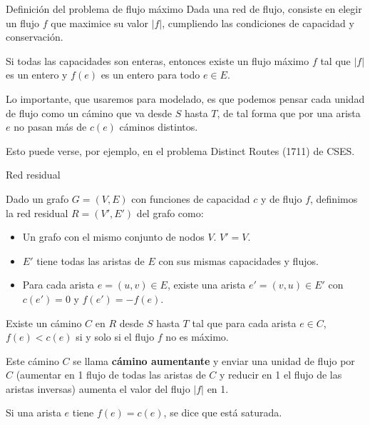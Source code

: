 \documentclass{beamer}
\begin{document}
\begin{frame}{Definición del problema de flujo máximo}
    Dada una red de flujo, consiste en elegir un flujo $f$ que maximice su valor $|f|$, cumpliendo las condiciones de capacidad y conservación.
    
    \begin{Theorem}
        Si todas las capacidades son enteras, entonces existe un flujo máximo $f$ tal que $|f|$ es un entero y $f(e)$ es un entero para todo $e \in E$.
    \end{Theorem}

    \pause

    Lo importante, que usaremos para modelado, es que podemos pensar cada unidad de flujo como un cámino que va desde $S$ hasta $T$, de tal forma que por una arista $e$ no pasan más de $c(e)$ cáminos distintos.

    Esto puede verse, por ejemplo, en el problema Distinct Routes (1711) de CSES.
\end{frame}

\begin{frame}{Red residual}
    \begin{definition}
        Dado un grafo $G = (V,E)$ con funciones de capacidad $c$ y de flujo $f$, definimos la red residual $R = (V',E')$ del grafo como:
        \begin{itemize}
            \item Un grafo con el mismo conjunto de nodos $V$. $V' = V$.
            \item $E'$ tiene todas las aristas de $E$ con sus mismas capacidades y flujos.
            \item Para cada arista $e = (u,v) \in E$, existe una arista $e' = (v,u) \in E'$ con $c(e') = 0$ y $f(e') = -f(e)$.
        \end{itemize}
    \end{definition}

    \pause 

    \begin{Theorem}
        Existe un cámino $C$ en $R$ desde $S$ hasta $T$ tal que para cada arista $e \in C$, $f(e)<c(e)$ si y solo si el flujo $f$ no es máximo.

        Este cámino $C$ se llama \textbf{cámino aumentante} y enviar una unidad de flujo por $C$ (aumentar en 1 flujo de todas las aristas de $C$ y reducir en 1 el flujo de las aristas inversas) aumenta el valor del flujo $|f|$ en 1.
    \end{Theorem}

    Si una arista $e$ tiene $f(e) = c(e)$, se dice que está saturada.
\end{frame}
\end{document}
